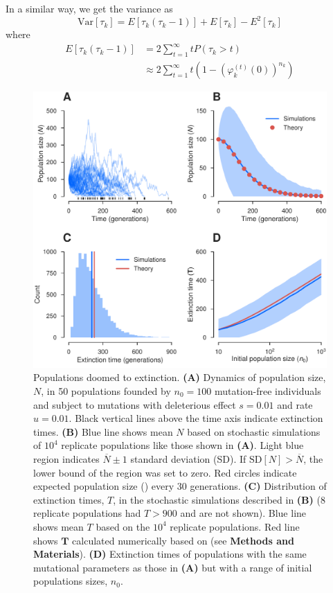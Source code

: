 \documentclass[9pt,lineno]{elife}
\begin{document}
In a similar way, we get the variance as
%
\begin{equation}
\mathrm{Var}[\tau_{k}]=E[\tau_{k}(\tau_{k}-1)]+E[\tau_{k}]-E^{2}[\tau_{k}]
\label{eq:vartauk}
\end{equation}
%
where
%
\begin{align*}
%
E[\tau_{k}(\tau_{k}-1)] & =  2\sum_{t=1}^{\infty}tP(\tau_{k}>t)\\[5pt]
& \approx  2\sum_{t=1}^{\infty}t\left(1-\left(\varphi_{k}^{(t)}(0)\right)^{n_k}\right)
%
\end{align*}


\begin{figure}[ht!]
\includegraphics[width=.67\linewidth]{decay.pdf}
\caption{Populations doomed to extinction.  
%
\textbf{(A)} Dynamics of population size, $N$, in 50 populations founded by $n_0=100$ mutation-free individuals and subject to mutations with deleterious effect $s=0.01$ and rate $u=0.01$.  Black vertical lines above the time axis indicate extinction times.
%
\textbf{(B)} Blue line shows mean $N$ based on stochastic simulations of $10^4$ replicate populations like those shown in \textbf{(A)}.  
Light blue region indicates $\overline{N} \pm 1$ standard deviation (SD). If $\mathrm{SD}[N] > \overline{N}$, the lower bound of the region was set to zero.  
Red circles indicate expected population size () every 30 generations.
%
\textbf{(C)} Distribution of extinction times, $T$, in the stochastic simulations described in \textbf{(B)} (8 replicate populations had $T > 900$ and are not shown). 
Blue line shows mean $T$ based on the $10^4$ replicate populations.  
Red line shows $\mathbf{T}$ calculated numerically based on  (see \textbf{Methods and Materials}).  
%
\textbf{(D)} Extinction times of populations with the same mutational parameters as those in \textbf{(A)} but with a range of initial populations sizes, $n_0$.
}
\end{figure}
\end{document}
